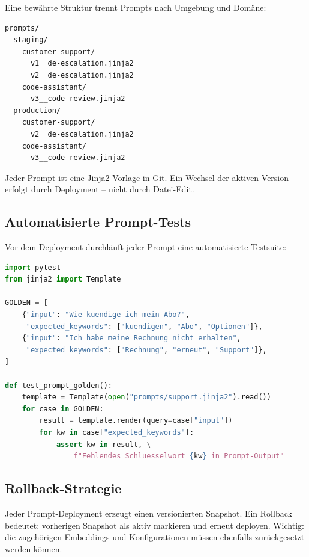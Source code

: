 Eine bewährte Struktur trennt Prompts nach Umgebung und Domäne:

\begin{verbatim}
prompts/
  staging/
    customer-support/
      v1__de-escalation.jinja2
      v2__de-escalation.jinja2
    code-assistant/
      v3__code-review.jinja2
  production/
    customer-support/
      v2__de-escalation.jinja2
    code-assistant/
      v3__code-review.jinja2
\end{verbatim}

Jeder Prompt ist eine Jinja2-Vorlage in Git. Ein Wechsel der aktiven Version erfolgt durch Deployment -- nicht durch Datei-Edit.

\subsection{Automatisierte Prompt-Tests}

Vor dem Deployment durchläuft jeder Prompt eine automatisierte Testsuite:

\begin{lstlisting}[language=Python,caption=Prompt-Test mit Golden Dataset]
import pytest
from jinja2 import Template

GOLDEN = [
    {"input": "Wie kuendige ich mein Abo?",
     "expected_keywords": ["kuendigen", "Abo", "Optionen"]},
    {"input": "Ich habe meine Rechnung nicht erhalten",
     "expected_keywords": ["Rechnung", "erneut", "Support"]},
]

def test_prompt_golden():
    template = Template(open("prompts/support.jinja2").read())
    for case in GOLDEN:
        result = template.render(query=case["input"])
        for kw in case["expected_keywords"]:
            assert kw in result, \
                f"Fehlendes Schluesselwort {kw} in Prompt-Output"
\end{lstlisting}

\subsection{Rollback-Strategie}

Jeder Prompt-Deployment erzeugt einen versionierten Snapshot. Ein Rollback bedeutet: vorherigen Snapshot als aktiv markieren und erneut deployen. Wichtig: die zugehörigen Embeddings und Konfigurationen müssen ebenfalls zurückgesetzt werden können.

